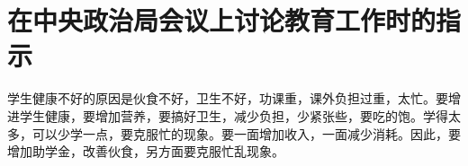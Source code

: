 \section[在中央政治局会议上讨论教育工作时的指示（一九五八年一月三十一日）]{在中央政治局会议上讨论教育工作时的指示}


学生健康不好的原因是伙食不好，卫生不好，功课重，课外负担过重，太忙。要增进学生健康，要增加营养，要搞好卫生，减少负担，少紧张些，要吃的饱。学得太多，可以少学一点，要克服忙的现象。要一面增加收入，一面减少消耗。因此，要增加助学金，改善伙食，另方面要克服忙乱现象。

